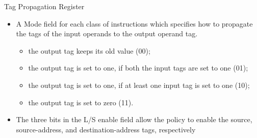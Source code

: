 \begin{frame}[noframenumbering]{Tag Propagation Register}
    \begin{table}[!t]
        \centering
        \caption{Tag Propagation Register configuration}
        \label{tab:tpr}
    \end{table}

    \begin{itemize}
        \justifying
        \item A Mode field for each class of instructions which specifies how to propagate the tags of the input operands to the output operand tag.
              \begin{itemize}
                  \justifying
                  \item the output tag keeps its old value (00);
                  \item the output tag is set to one, if both the input tags are set to one (01);
                  \item the output tag is set to one, if at least one input tag is set to one (10);
                  \item the output tag is set to zero (11).
              \end{itemize}
        \item The three bits in the L/S enable field allow the policy to enable the source, source-address, and destination-address tags, respectively
    \end{itemize}
\end{frame}

